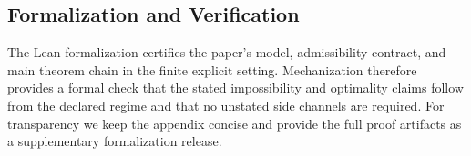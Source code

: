 \subsection{Formalization and Verification}\label{formalization-and-verification}

The Lean formalization certifies the paper's model, admissibility contract, and main theorem chain in the finite explicit setting. Mechanization therefore provides a formal check that the stated impossibility and optimality claims follow from the declared regime and that no unstated side channels are required. For transparency we keep the appendix concise and provide the full proof artifacts as a supplementary formalization release.

\newcommand{\LeanLinesAbstractClassSystemAggregate}{\number\numexpr\LeanLinesAbstractClassSystemBZeroFourFiveefNineFour+\LeanLinesAbstractClassSystemAxisClosure+\LeanLinesAbstractClassSystemBridge+\LeanLinesAbstractClassSystemCore+\LeanLinesAbstractClassSystemExtended+\LeanLinesAbstractClassSystemGraphBridges+\LeanLinesAbstractClassSystemTyping+\LeanLinesAbstractClassSystemEightOneSixTwoFourOnebFour\relax}
\newcommand{\LeanTheoremsAbstractClassSystemAggregate}{\number\numexpr\LeanTheoremsAbstractClassSystemBZeroFourFiveefNineFour+\LeanTheoremsAbstractClassSystemAxisClosure+\LeanTheoremsAbstractClassSystemBridge+\LeanTheoremsAbstractClassSystemCore+\LeanTheoremsAbstractClassSystemExtended+\LeanTheoremsAbstractClassSystemGraphBridges+\LeanTheoremsAbstractClassSystemTyping+\LeanTheoremsAbstractClassSystemEightOneSixTwoFourOnebFour\relax}
\newcommand{\LeanLinesCoreShown}{\number\numexpr\LeanLinesAbstractClassSystemAggregate+\LeanLinesAxisFramework+\LeanLinesNominalResolution+\LeanLinesDisciplineMigration+\LeanLinesContextFormalization+\LeanLinesPythonInstantiation+\LeanLinesTypescriptInstantiation+\LeanLinesJavaInstantiation+\LeanLinesRustInstantiation+\LeanLinesLwdConverse\relax}
\newcommand{\LeanTheoremsCoreShown}{\number\numexpr\LeanTheoremsAbstractClassSystemAggregate+\LeanTheoremsAxisFramework+\LeanTheoremsNominalResolution+\LeanTheoremsDisciplineMigration+\LeanTheoremsContextFormalization+\LeanTheoremsPythonInstantiation+\LeanTheoremsTypescriptInstantiation+\LeanTheoremsJavaInstantiation+\LeanTheoremsRustInstantiation+\LeanTheoremsLwdConverse\relax}
\newcommand{\LeanLinesSupportFiles}{\number\numexpr\LeanTotalLines-\LeanLinesCoreShown\relax}
\newcommand{\LeanTheoremsSupportFiles}{\number\numexpr\LeanTotalTheorems-\LeanTheoremsCoreShown\relax}


